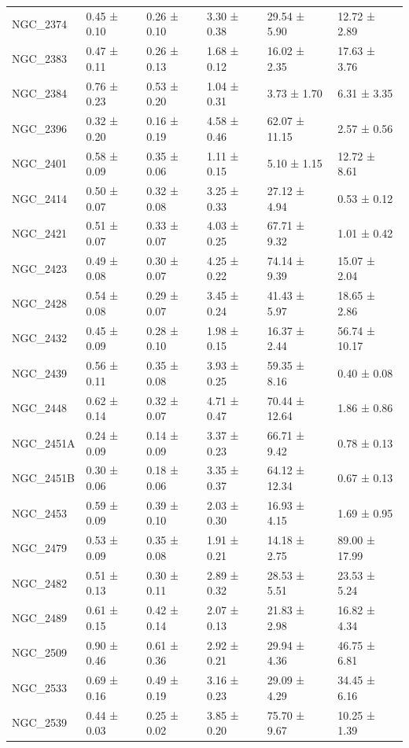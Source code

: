 \begin{tabular}{llllll}
NGC_2374 & 0.45 ± 0.10 & 0.26 ± 0.10 & 3.30 ± 0.38 & 29.54 ± 5.90 & 12.72 ± 2.89 \\
NGC_2383 & 0.47 ± 0.11 & 0.26 ± 0.13 & 1.68 ± 0.12 & 16.02 ± 2.35 & 17.63 ± 3.76 \\
NGC_2384 & 0.76 ± 0.23 & 0.53 ± 0.20 & 1.04 ± 0.31 & 3.73 ± 1.70 & 6.31 ± 3.35 \\
NGC_2396 & 0.32 ± 0.20 & 0.16 ± 0.19 & 4.58 ± 0.46 & 62.07 ± 11.15 & 2.57 ± 0.56 \\
NGC_2401 & 0.58 ± 0.09 & 0.35 ± 0.06 & 1.11 ± 0.15 & 5.10 ± 1.15 & 12.72 ± 8.61 \\
NGC_2414 & 0.50 ± 0.07 & 0.32 ± 0.08 & 3.25 ± 0.33 & 27.12 ± 4.94 & 0.53 ± 0.12 \\
NGC_2421 & 0.51 ± 0.07 & 0.33 ± 0.07 & 4.03 ± 0.25 & 67.71 ± 9.32 & 1.01 ± 0.42 \\
NGC_2423 & 0.49 ± 0.08 & 0.30 ± 0.07 & 4.25 ± 0.22 & 74.14 ± 9.39 & 15.07 ± 2.04 \\
NGC_2428 & 0.54 ± 0.08 & 0.29 ± 0.07 & 3.45 ± 0.24 & 41.43 ± 5.97 & 18.65 ± 2.86 \\
NGC_2432 & 0.45 ± 0.09 & 0.28 ± 0.10 & 1.98 ± 0.15 & 16.37 ± 2.44 & 56.74 ± 10.17 \\
NGC_2439 & 0.56 ± 0.11 & 0.35 ± 0.08 & 3.93 ± 0.25 & 59.35 ± 8.16 & 0.40 ± 0.08 \\
NGC_2448 & 0.62 ± 0.14 & 0.32 ± 0.07 & 4.71 ± 0.47 & 70.44 ± 12.64 & 1.86 ± 0.86 \\
NGC_2451A & 0.24 ± 0.09 & 0.14 ± 0.09 & 3.37 ± 0.23 & 66.71 ± 9.42 & 0.78 ± 0.13 \\
NGC_2451B & 0.30 ± 0.06 & 0.18 ± 0.06 & 3.35 ± 0.37 & 64.12 ± 12.34 & 0.67 ± 0.13 \\
NGC_2453 & 0.59 ± 0.09 & 0.39 ± 0.10 & 2.03 ± 0.30 & 16.93 ± 4.15 & 1.69 ± 0.95 \\
NGC_2479 & 0.53 ± 0.09 & 0.35 ± 0.08 & 1.91 ± 0.21 & 14.18 ± 2.75 & 89.00 ± 17.99 \\
NGC_2482 & 0.51 ± 0.13 & 0.30 ± 0.11 & 2.89 ± 0.32 & 28.53 ± 5.51 & 23.53 ± 5.24 \\
NGC_2489 & 0.61 ± 0.15 & 0.42 ± 0.14 & 2.07 ± 0.13 & 21.83 ± 2.98 & 16.82 ± 4.34 \\
NGC_2509 & 0.90 ± 0.46 & 0.61 ± 0.36 & 2.92 ± 0.21 & 29.94 ± 4.36 & 46.75 ± 6.81 \\
NGC_2533 & 0.69 ± 0.16 & 0.49 ± 0.19 & 3.16 ± 0.23 & 29.09 ± 4.29 & 34.45 ± 6.16 \\
NGC_2539 & 0.44 ± 0.03 & 0.25 ± 0.02 & 3.85 ± 0.20 & 75.70 ± 9.67 & 10.25 ± 1.39 \\

\end{tabular}
